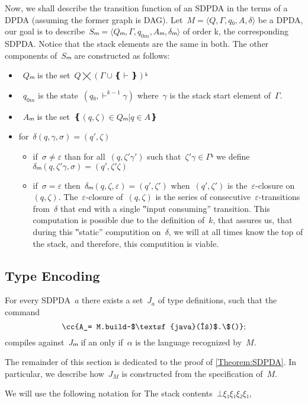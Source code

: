Now, we shall describe the transition function of an SDPDA in the terms of a DPDA (assuming the former graph is DAG).
Let~$M=⟨Q,Γ,q₀,A,δ⟩$ be a DPDA, our goal is to describe~$Sₘ=⟨Qₘ,Γ,q_{0m},Aₘ,δₘ⟩$
  of order k, the corresponding SDPDA.
Notice that the stack elements are the same in both.
The other components of~$Sₘ$ are constructed as follows:
\begin{itemize}
 \item~$Qₘ$ is the set~$Q⨉\left(Γ∪❴\vdash❵\right)ᵏ$
 \item~$q_{0m}$ is the state~$(q₀,\vdash^{k-1}γ)$ where~$γ$ is the stack start element of~$Γ$.
 \item~$Aₘ$ is the set~$❴(q,ζ)∈Qₘ | q∈A❵$
 \item for~$δ(q,γ,σ) = (q',ζ)$
 \begin{itemize}
  \item if~$σ≠ε$ than for all~$(q,ζ'γ')$ such that~$ζ'γ∈Γᵏ$
    we define~$δₘ(q,ζ'γ,σ)=(q',ζ'ζ)$
  \item if~$σ=ε$ then~$δₘ(q,ζ,ε)=(q',ζ')$ when~$(q',ζ')$
    is the~$ε$-closure on~$(q,ζ)$.
    The~$ε$-closure of~$(q,ζ)$ is the series of consecutive~$ε$-transitions from~$δ$
    that end with a single ‟input consuming” transition.
    This computation is possible due to the definition of~$k$, that assures us, that during this ‟static”
    computition on~$δ$, we will at all times know the top of the stack, and therefore, this computition
    is viable.
 \end{itemize}

\end{itemize}

\subsection{Type Encoding}
\begin{Theorem}
  \label{Theorem:SDPDA}
  For every SDPDA~$a$ there exists a set~$J_a$ of \Java type definitions, such that
  the command \[
    \cc{A_= M.build~$\textsf{java}(α)$.\$()};
  \]
  compiles against~$Jₘ$ if an only if~$α$ is the language recognized by~$M$.
\end{Theorem}

The remainder of this section is dedicated to the proof of \cref{Theorem:SDPDA}.
In particular, we describe how~$J_M$ is constructed from the
  specification of~$M$.

We will use the following notation for
The stack contents~$⊥ξ₁ξ₁ξ₂ξ₁$,

